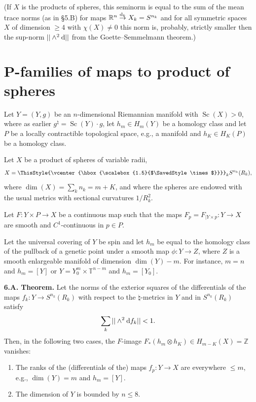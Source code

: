 \documentclass[10pt,a4paper]{amsart}
\numberwithin{equation}{section}
\newcommand\bigtimes{\mathbin{\ThisStyle{\vcenter{\hbox{%
\scalebox{1.5}{$\SavedStyle\times$}}}}}}
\begin{document}
 (If $X$ is the products of spheres, this seminorm is equal to the sum of the mean trace norms (as in \S5.B) for maps
 $\mathbb R^n\overset {{\rm d}_k}\to X_k=S^{n_k}$ and for
 all symmetric spaces $X$ of dimension $\geq 4$ with $\chi(X)\neq 0$ this norm is, probably, strictly smaller then the sup-norm $||\wedge^2{\rm d}||$ from the Goette--Semmelmann theorem.)


\section[P-families of maps to product of spheres]{$\boldsymbol{P}$-families of maps to product of spheres}\label{section6}

Let $Y=(Y,g) $ be an $n$-dimensional Riemannian manifold with $\operatorname{Sc}(X)>0$, where as earlier
$g^\natural =\operatorname{Sc}(Y)\cdot g$,
 let $h_m\in H_m(Y)$ be a homology class and let $P$ be a locally contractible topological space, e.g., a manifold and $h_K\in H_K(P)$ be a homology class.

Let $X$ be a product of spheres of variable radii,
\[
X=\bigtimes _kS^{n_k}(R_k),
\]
where $\dim(X)=\sum_kn_k=m+K$, and where the spheres are endowed with the usual metrics with sectional curvatures $1/R_k^2$.

 Let $F\colon Y \times P\to X$ be a continuous map such that
 the maps $F_p=F_{|Y\times p}\colon Y\to X$ are smooth and $C^1$-continuous in $p\in P$.

Let the universal covering of $Y$ be spin and let $h_m$ be equal to the homology class of the pullback of a genetic point under a smooth map $\phi\colon Y\to Z$, where $Z$ is a smooth enlargeable manifold of
 dimension $\dim(Y)-m$. For instance, $m=n$ and $h_m=[Y]$ or
 $Y =Y_0^m\times \mathbb T^{n-m}$ and $h_m=[Y_0]$.

\textbf {6.A. Theorem.}  Let the norms of the exterior squares of the differentials of the maps $f_k\colon Y\to S^{n_k}(R_k)$ with respect to the $\natural$-metrics in $Y$ and in $S^{n_k}(R_k)$ satisfy
\begin{equation*}
\sum_k||\wedge^2{\rm d}f_k||< 1. %
\end{equation*}
 Then, in the following two cases,
the $F$-image $F_\ast(h_m\otimes h_K)\in H_{m-K}(X)=\mathbb Z$ vanishes:
\begin{enumerate}\itemsep=0pt
\item[(1)] The ranks of the (differentials of the) maps $f_{p}\colon Y\to X$ are everywhere $\leq m$, e.g., $\dim(Y)=m$ and $h_m=[Y]$.
\item[(2)] The dimension of $Y$ is bounded by $n\leq 8$.
\end{enumerate}
\end{document}
